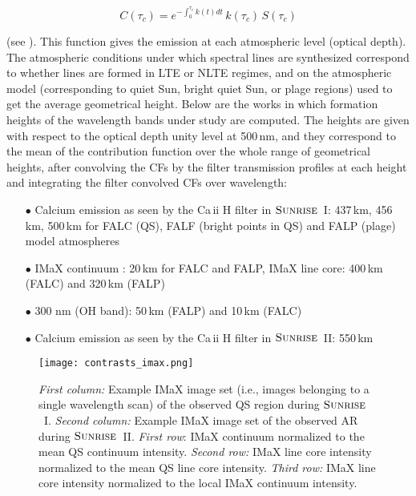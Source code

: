\documentclass[goettingen, gauss, print]{thesis}
\begin{document}
\begin{equation}
C(\tau_c) = e^{-\int_0^{\tau_c} k(t) dt} \,k(\tau_c)\,S(\tau_c)
\end{equation}


(see \cite{grossmann-doerth_unshifted_1988}). This function gives the emission at each atmospheric level (optical depth). The atmospheric conditions under which spectral lines are synthesized correspond to whether lines are formed in LTE or NLTE regimes, and on the atmospheric model (corresponding to quiet Sun, bright quiet Sun, or plage regions) used to get the average geometrical height. Below are the works in which formation heights of the wavelength bands under study are computed. The heights are given with respect to the optical depth unity level at 500\,nm, and they correspond to the mean of the contribution function over the whole range of geometrical heights, after convolving the CFs by the filter transmission profiles at each height and integrating the filter convolved CFs over wavelength:

\begin{enumerate}
\item[$\bullet$] Calcium emission as seen by the Ca\,{\sc ii} H filter in $\textsc{Sunrise}$~I: 437\,km, 456\,km, 500\,km for FALC (QS), FALF (bright points in QS) and FALP (plage) model atmospheres \citep{jafarzadeh_structure_2013}
\item[$\bullet$] IMaX continuum : 20\,km for FALC and FALP, IMaX line core: 400\,km (FALC) and 320\,km (FALP) \citep{jafarzadeh_inclinations_2014} 
\item[$\bullet$] 300 nm (OH band): 50\,km (FALP) and 10\,km (FALC) \citep{jafarzadeh_high-frequency_2017}
\item[$\bullet$] Calcium emission as seen by the Ca\,{\sc ii} H filter in $\textsc{Sunrise}$~II: 550\,km \citep{jafarzadeh_slender_2017}
\end{enumerate}



\begin{figure}[h]
\centering
\texttt{[image: contrasts\_imax.png]}
\caption{\textit{First column:} Example IMaX image set (i.e., images belonging to a single wavelength scan) of the observed QS region during $\textsc{Sunrise}$~I. \textit{Second column:} Example IMaX image set of the observed AR during $\textsc{Sunrise}$~II. \textit{First row}: IMaX continuum normalized to the mean QS continuum intensity. \textit{Second row:} IMaX line core intensity normalized to the mean QS line core intensity. \textit{Third row:} IMaX line core intensity normalized to the local IMaX continuum intensity. }
\label{contrasts_imax}
\end{figure} 
\end{document}
